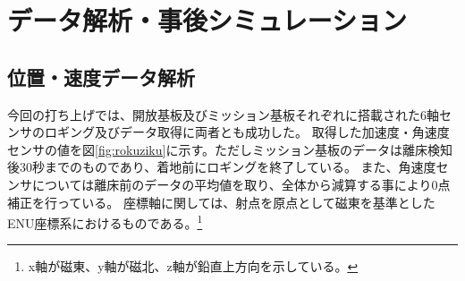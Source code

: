 \documentclass[a4paper,11pt,uplatex]{jsarticle}
\begin{document}
\section{データ解析・事後シミュレーション}
\label{sc:sim}
\subsection{位置・速度データ解析}
\label{itisokudo}
今回の打ち上げでは、開放基板及びミッション基板それぞれに搭載された6軸センサのロギング及びデータ取得に両者とも成功した。
取得した加速度・角速度センサの値を図\ref{fig:rokuziku}に示す。ただしミッション基板のデータは離床検知後30秒までのものであり、着地前にロギングを終了している。
また、角速度センサについては離床前のデータの平均値を取り、全体から減算する事により0点補正を行っている。
座標軸に関しては、射点を原点として磁東を基準としたENU座標系におけるものである。\footnote{x軸が磁東、y軸が磁北、z軸が鉛直上方向を示している。}
\end{document}
